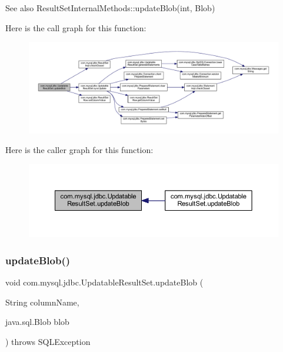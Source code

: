 \begin{DoxySeeAlso}{See also}
Result\+Set\+Internal\+Methods\+::update\+Blob(int, Blob) 
\end{DoxySeeAlso}
Here is the call graph for this function\+:
\nopagebreak
\begin{figure}[H]
\begin{center}
\leavevmode
\includegraphics[width=350pt]{classcom_1_1mysql_1_1jdbc_1_1_updatable_result_set_ad0944789b1d55512febb7da626bed70d_cgraph}
\end{center}
\end{figure}
Here is the caller graph for this function\+:
\nopagebreak
\begin{figure}[H]
\begin{center}
\leavevmode
\includegraphics[width=350pt]{classcom_1_1mysql_1_1jdbc_1_1_updatable_result_set_ad0944789b1d55512febb7da626bed70d_icgraph}
\end{center}
\end{figure}
\mbox{\label{classcom_1_1mysql_1_1jdbc_1_1_updatable_result_set_a45f34643eaea2f5cdf81f8ac0589607c}} 
\subsubsection{\texorpdfstring{update\+Blob()}{updateBlob()}\hspace{0.1cm}{\footnotesize\ttfamily [2/2]}}
{\footnotesize\ttfamily void com.\+mysql.\+jdbc.\+Updatable\+Result\+Set.\+update\+Blob (\begin{DoxyParamCaption}\item[{String}]{column\+Name,  }\item[{java.\+sql.\+Blob}]{blob }\end{DoxyParamCaption}) throws S\+Q\+L\+Exception}

